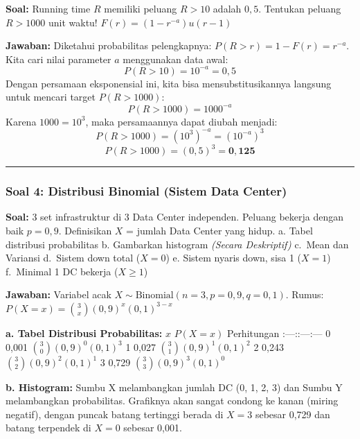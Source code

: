 \documentclass[
  letterpaper,
  DIV=11,
  numbers=noendperiod]{scrartcl}
\begin{document}
\textbf{Soal:} Running time \(R\) memiliki peluang \(R > 10\) adalah
\(0,5\). Tentukan peluang \(R > 1000\) unit waktu!
\(F(r) = (1 - r^{-a}) u(r-1)\)

\textbf{Jawaban:} Diketahui probabilitas pelengkapnya:
\(P(R > r) = 1 - F(r) = r^{-a}\). Kita cari nilai parameter \(a\)
menggunakan data awal: \[ P(R > 10) = 10^{-a} = 0,5 \] Dengan persamaan
eksponensial ini, kita bisa mensubstitusikannya langsung untuk mencari
target \(P(R > 1000)\): \[ P(R > 1000) = 1000^{-a} \] Karena
\(1000 = 10^3\), maka persamaannya dapat diubah menjadi:
\[ P(R > 1000) = (10^3)^{-a} = (10^{-a})^3 \]
\[ P(R > 1000) = (0,5)^3 = \mathbf{0,125} \]

\begin{center}\rule{0.5\linewidth}{0.5pt}\end{center}

\subsubsection{\texorpdfstring{\textbf{Soal 4: Distribusi Binomial
(Sistem Data
Center)}}{Soal 4: Distribusi Binomial (Sistem Data Center)}}\label{soal-4-distribusi-binomial-sistem-data-center}

\textbf{Soal:} 3 set infrastruktur di 3 Data Center independen. Peluang
bekerja dengan baik \(p = 0,9\). Definisikan \(X\) = jumlah Data Center
yang hidup. a. Tabel distribusi probabilitas b. Gambarkan histogram
\emph{(Secara Deskriptif)} c.~Mean dan Variansi d.~Sistem down total
(\(X=0\)) e. Sistem nyaris down, sisa 1 (\(X=1\)) f.~Minimal 1 DC
bekerja (\(X \ge 1\))

\textbf{Jawaban:} Variabel acak
\(X \sim \text{Binomial}(n=3, p=0,9, q=0,1)\). Rumus:
\(P(X=x) = \binom{3}{x} (0,9)^x (0,1)^{3-x}\)

\textbf{a. Tabel Distribusi Probabilitas:} \textbar{} \(x\) \textbar{}
\(P(X=x)\) \textbar{} Perhitungan \textbar{}
\textbar:---:\textbar:---\textbar:---\textbar{} \textbar{} 0 \textbar{}
0,001 \textbar{} \(\binom{3}{0} (0,9)^0 (0,1)^3\) \textbar{} \textbar{}
1 \textbar{} 0,027 \textbar{} \(\binom{3}{1} (0,9)^1 (0,1)^2\)
\textbar{} \textbar{} 2 \textbar{} 0,243 \textbar{}
\(\binom{3}{2} (0,9)^2 (0,1)^1\) \textbar{} \textbar{} 3 \textbar{}
0,729 \textbar{} \(\binom{3}{3} (0,9)^3 (0,1)^0\) \textbar{}

\textbf{b. Histogram:} Sumbu X melambangkan jumlah DC (0, 1, 2, 3) dan
Sumbu Y melambangkan probabilitas. Grafiknya akan sangat condong ke
kanan (miring negatif), dengan puncak batang tertinggi berada di \(X=3\)
sebesar 0,729 dan batang terpendek di \(X=0\) sebesar 0,001.
\end{document}

